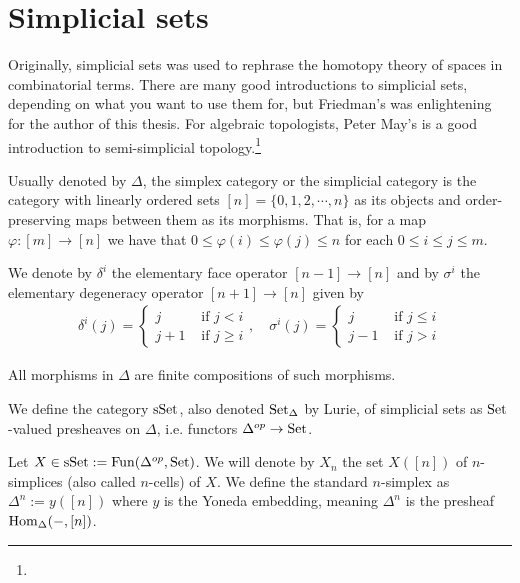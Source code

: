 \documentclass[../../thesis.tex]{subfiles}
\begin{document}
\section{Simplicial sets}
Originally, simplicial sets was used to rephrase the homotopy theory of spaces in combinatorial terms.
There are many good introductions to simplicial sets, depending on what you want to use them for, but Friedman's \cite{friedman2021elementary} was enlightening for the author of this thesis.
For algebraic topologists, Peter May's \cite{MAY} is a good introduction to semi-simplicial topology.\footnote{}
\begin{definition}
    Usually denoted by $\Delta$, the simplex category or the simplicial category is the category with linearly ordered sets $[n]=\{0,1,2,\cdots ,n\}$ as its objects and order-preserving maps between them as its morphisms.
    That is, for a map $\varphi:[m] \to [n]$ we have that $0 \leq \varphi(i)\leq \varphi(j)\leq n$ for each $0 \leq i \leq j \leq m$.
\end{definition}
We denote by $\delta^i$ the elementary face operator $[n-1] \to [n]$ and by $\sigma^i$ the elementary degeneracy operator $[n+1] \to [n]$ given by
\[
    \begin{aligned}
        \delta^i(j) =
        \begin{cases}
            j   & \text{ if } j < i    \\
            j+1 & \text{ if } j \geq i
        \end{cases}, \quad
        \sigma^i(j) =
        \begin{cases}
            j   & \text{ if } j \leq i \\
            j-1 & \text{ if } j > i
        \end{cases}
    \end{aligned}
\]
\begin{remark}
    All morphisms in $\Delta$ are finite compositions of such morphisms.
\end{remark}
\begin{definition}
    We define the category $\mathrm{sSet}$, also denoted $\mathrm{Set}_{\Delta}$ by Lurie, of simplicial sets as $\mathrm{Set}$-valued presheaves on $\Delta$, i.e. functors $\Delta^{op}\to\mathrm{Set}$.
\end{definition}
Let $X \in \mathrm{sSet} : = \mathrm{Fun}(\Delta^{op}, \mathrm{Set})$. We will denote by $X_n$ the set $X([n])$ of $n$-simplices (also called $n$-cells) of $X$.
We define the standard $n$-simplex as $\Delta^n:=y([n])$ where $y$ is the Yoneda embedding, meaning $\Delta^n$ is the presheaf $\mathrm{Hom}_{\Delta}({-},[n])$.
\end{document}
